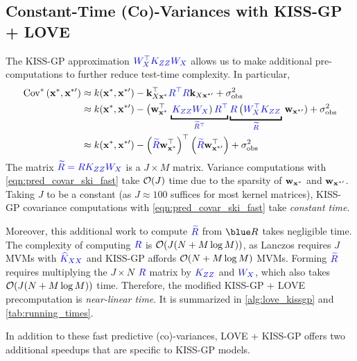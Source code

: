 \subsection{Constant-Time (Co)-Variances with KISS-GP + LOVE}
The KISS-GP approximation $\color{blue} W_{X}^\top K_{Z Z} W_{X}$ allows us to make additional pre-computations to further reduce test-time complexity.
In particular,
%
\begin{align}
  \covtest{\bxtest}{\bxtestprime}
  &\approx k(\bxtest, \bxtestprime) - \bk_{\bX \bxtest}^\top {\color{blue} \bR^\top \bR} \bk_{\bX \bxtestprime} + \sigma^2_\text{obs}
  \nonumber
  \\
  &\approx k(\bxtest, \bxtestprime) - \left( \bw^\top_{\bxtest} \right. \underbracket{\left. {\color{blue} \bK_{\bZ\bZ} \bW_\bX} \right) {\color{blue} \bR^\top}}_{\color{blue} \widetilde \bR^\top}
  \underbracket{{\color{blue} \bR} \left( {\color{blue} \bW_\bX^\top \bK_{\bZ\bZ}} \right.}_{\color{blue} \widetilde \bR} \left. \bw_{\bxtestprime} \right) + \sigma^2_\text{obs}
  \nonumber
  \\
  &\approx k(\bxtest, \bxtestprime) -
  \left( {\color{blue} \widetilde \bR} \bw^\top_{\bxtest} \right)^\top
  \left( {\color{blue} \widetilde \bR} \bw^\top_{\bxtestprime} \right) + \sigma^2_\text{obs}
  \label{eqn:pred_covar_ski_fast}
\end{align}
%
The matrix $\color{blue} \widetilde {R} = R K_{ZZ} W_{X}$ is a $J \times M$ matrix.
Variance computations with \cref{eqn:pred_covar_ski_fast} take $\bigo{J}$ time due to the sparsity of $\mathbf{w}_{\mathbf{x}^*}$ and $\mathbf{w}_{\mathbf{x}^{*\prime}}$.
Taking $J$ to be a constant (as $J \approx 100$ suffices for most kernel matrices), KISS-GP covariance computations with \cref{eqn:pred_covar_ski_fast} take \emph{constant time}.

Moreover, this additional work to compute $\color{blue} \widetilde {R}$ from $\blue \bR$ takes negligible time.
The complexity of computing $\color{blue} R$ is $\bigo{J(N + M \log M)}$, as Lanczos requires $J$ MVMs with $\color{blue} \widehat{K}_{XX}$ and KISS-GP affords $\bigo{N + M \log M}$ MVMs.
Forming $\color{blue} \widetilde {R}$ requires multiplying the $J \! \times \! N$ $\color{blue} R$ matrix by $\color{blue} K_{ZZ}$ and $\color{blue} W_{X}$, which also takes $\bigo{J(N + M \log M)}$ time.
Therefore, the modified KISS-GP + LOVE precomputation is \emph{near-linear time}.
It is summarized in \cref{alg:love_kissgp} and \cref{tab:running_times}.

In addition to these fast predictive (co)-variances, LOVE + KISS-GP offers two additional speedups that are specific to KISS-GP models.




